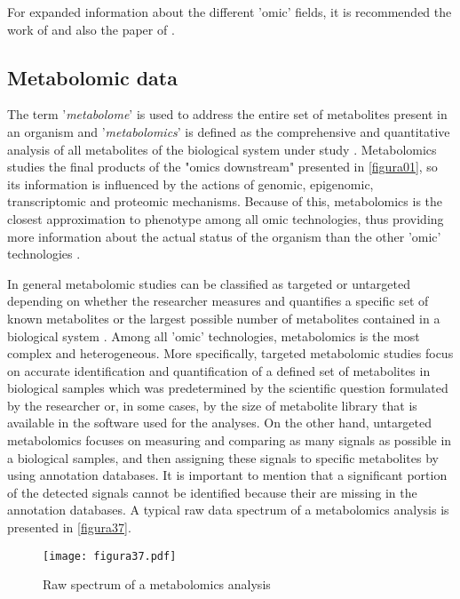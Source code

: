 For expanded information about the different 'omic' fields, it is recommended the work of \cite{2018iv} and also the paper of \cite{horgan2011omic}.

\subsection{Metabolomic data}
The term '\textit{metabolome}' is used to address the entire set of metabolites present in an organism and '\textit{metabolomics}' is defined as the comprehensive and quantitative analysis of all metabolites of the biological system under study \parencite{fiehn2001combining}. Metabolomics studies the final products of the "omics downstream" presented in \autoref{figura01}, so its information is influenced by the actions of genomic, epigenomic, transcriptomic and proteomic mechanisms. Because of this, metabolomics is the closest approximation to phenotype among all omic technologies, thus providing  more information about the actual status of the organism than the other 'omic' technologies \parencite{beger2016metabolomics}. 

In general metabolomic studies can be classified as targeted or untargeted depending on whether the researcher measures and quantifies a specific set of known metabolites or the largest possible number of metabolites contained in a biological system \parencite{orevsivc2009metabolomics}. 
Among all 'omic' technologies, metabolomics is the most complex and heterogeneous. More specifically, targeted metabolomic studies focus on accurate identification and quantification of a defined set of metabolites in biological samples which was predetermined by the scientific question formulated by the researcher or, in some cases, by the size of metabolite library that is available in the software used for the analyses. On the other hand, untargeted metabolomics focuses on measuring and comparing as many signals as possible in a biological samples, and then assigning these signals to specific metabolites by using annotation databases. It is important to mention that a significant portion of the detected signals cannot be identified because their are missing in the annotation databases. A typical raw data spectrum of a metabolomics analysis is presented in \autoref{figura37}.

\begin{figure}[htbp]\centering
		\texttt{[image: figura37.pdf]}
		\caption{Raw spectrum of a metabolomics analysis}
		\label{figura37}
	\end{figure}


